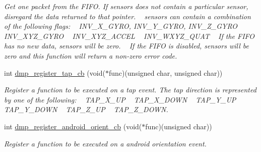 \begin{DoxyCompactItemize}
\begin{DoxyCompactList}\small\item\em Get one packet from the F\+I\+FO. If {\itshape sensors} does not contain a particular sensor, disregard the data returned to that pointer. ~\newline
 {\itshape sensors} can contain a combination of the following flags\+: ~\newline
 I\+N\+V\+\_\+\+X\+\_\+\+G\+Y\+RO, I\+N\+V\+\_\+\+Y\+\_\+\+G\+Y\+RO, I\+N\+V\+\_\+\+Z\+\_\+\+G\+Y\+RO ~\newline
 I\+N\+V\+\_\+\+X\+Y\+Z\+\_\+\+G\+Y\+RO ~\newline
 I\+N\+V\+\_\+\+X\+Y\+Z\+\_\+\+A\+C\+C\+EL ~\newline
 I\+N\+V\+\_\+\+W\+X\+Y\+Z\+\_\+\+Q\+U\+AT ~\newline
 If the F\+I\+FO has no new data, {\itshape sensors} will be zero. ~\newline
 If the F\+I\+FO is disabled, {\itshape sensors} will be zero and this function will return a non-\/zero error code. \end{DoxyCompactList}\item 
int \hyperlink{group___d_r_i_v_e_r_s_ga8a2df36126e34b78863e3acf1249d814}{dmp\+\_\+register\+\_\+tap\+\_\+cb} (void($\ast$func)(unsigned char, unsigned char))
\begin{DoxyCompactList}\small\item\em Register a function to be executed on a tap event. The tap direction is represented by one of the following\+: ~\newline
 T\+A\+P\+\_\+\+X\+\_\+\+UP ~\newline
 T\+A\+P\+\_\+\+X\+\_\+\+D\+O\+WN ~\newline
 T\+A\+P\+\_\+\+Y\+\_\+\+UP ~\newline
 T\+A\+P\+\_\+\+Y\+\_\+\+D\+O\+WN ~\newline
 T\+A\+P\+\_\+\+Z\+\_\+\+UP ~\newline
 T\+A\+P\+\_\+\+Z\+\_\+\+D\+O\+WN. \end{DoxyCompactList}\item 
int \hyperlink{group___d_r_i_v_e_r_s_ga2e66a02d29ec89466cf339587592943c}{dmp\+\_\+register\+\_\+android\+\_\+orient\+\_\+cb} (void($\ast$func)(unsigned char))
\begin{DoxyCompactList}\small\item\em Register a function to be executed on a android orientation event. \end{DoxyCompactList}\end{DoxyCompactItemize}


